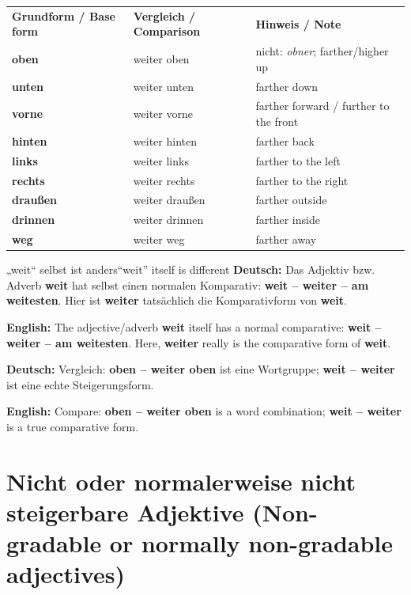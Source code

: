 \documentclass[a4paper,11pt]{article}
\newcommand{\GermanText}[1]{\textbf{Deutsch: }#1\par}
\newcommand{\EnglishText}[1]{{\small\color{SoftGray}\textbf{English: }#1\par}}
\begin{document}
      \begin{longtable}{>{\bfseries}p{3.0cm}|p{4.2cm}|p{6.3cm}}
         \rowcolor{HeaderBlueDark}
         \color{white}\textbf{Grundform / Base form} &
         \color{white}\textbf{Vergleich / Comparison} &
         \color{white}\textbf{Hinweis / Note} \\
         oben & weiter oben & nicht: \textit{obner}; farther/higher up \\
         unten & weiter unten & farther down \\
         vorne & weiter vorne & farther forward / further to the front \\
         hinten & weiter hinten & farther back \\
         links & weiter links & farther to the left \\
         rechts & weiter rechts & farther to the right \\
         draußen & weiter draußen & farther outside \\
         drinnen & weiter drinnen & farther inside \\
         weg & weiter weg & farther away \\
      \end{longtable}

      \begin{grammarentry}{„weit“ selbst ist anders}{“weit” itself is different}
         \GermanText{Das Adjektiv bzw. Adverb \textbf{weit} hat selbst einen normalen Komparativ: \textbf{weit -- weiter -- am weitesten}. Hier ist \textbf{weiter} tatsächlich die Komparativform von \textbf{weit}.}
         \EnglishText{The adjective/adverb \textbf{weit} itself has a normal comparative: \textbf{weit -- weiter -- am weitesten}. Here, \textbf{weiter} really is the comparative form of \textbf{weit}.}

         \GermanText{Vergleich: \textbf{oben -- weiter oben} ist eine Wortgruppe; \textbf{weit -- weiter} ist eine echte Steigerungsform.}
         \EnglishText{Compare: \textbf{oben -- weiter oben} is a word combination; \textbf{weit -- weiter} is a true comparative form.}
      \end{grammarentry}

   \section{Nicht oder normalerweise nicht steigerbare Adjektive \textnormal{(Non-gradable or normally non-gradable adjectives)}}
\end{document}
